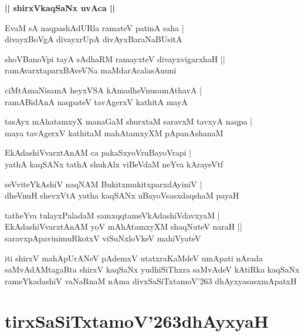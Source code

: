 \documentclass[twoside,12pt,openright]{book}
\def\S{\char'263}
\newcounter{shloka}[chapter]
\def\uvaca#1{\centerline{{\large\textbf{#1}}}}
\begin{document}
\uvaca{|| shirxVkaqSaNx uvAca ||}

\begin{shloka}%
EvaM sA naqpashAdURla ramateV patinA saha |\\
divayxBoVgA divayxrUpA divAyxBaraNaBUsitA
\end{shloka}

\begin{shloka}%
shoVBanoVpi tayA sAdhaRM ramayxteV divayxvigarxhaH ||\\
ramAvarxtaparxBAveVNa maMdarAcalasAnuni
\end{shloka}

\begin{shloka}%
ciMtAmaNisamA heyxVSA kAmadheVnusamAthavA |\\
ramABidAnA naqpateV tavAgerxV kathitA mayA
\end{shloka}

\begin{shloka}%
tasAyx mAhatamxyX manaGaM shurxtaM saravxM tavxyA naqpa |\\
maya tavAgerxV kathitaM mahAtamxyXM pApanAshanaM 
\end{shloka}

\begin{shloka}%
EkAdashiVvarxtAnAM ca pakaSxyoVruBayoVrapi |\\
yathA kaqSANx tathA shukAlx viBeVdaM neYva kArayeVtf
\end{shloka}

\begin{shloka}%
seVviteYkAshiV naqNAM BukitxmukitxparxdAyiniV |\\
dheVnuH shevxVtA yatha kaqSANx uBayoVsasxdaqshaM payaH
\end{shloka}

\begin{shloka}%
tatheYva tulayxPaladaM samxqqtameVkAdashiVdavxyaM |\\
EkAdashiVvarxtAnAM yoV mAhAtamxyXM shaqNuteV naraH ||\\
saravxpApavinimuRkotxV viSuNxloVkeV mahiVyateV
\end{shloka}

\begin{center}
iti shirxV mahApUrANeV pAdemxV utatxraKaMdeV umApati nArada saMvAdAMtagaRta shirxV kaqSaNx 
yudhiSiThxra saMvAdeV kAtiRka kaqSaNx rameYkadashiV vaNaRnaM nAma divxSaSiTxtamoV\S 
dhAyxyasasxmApatxH
\end{center}

\chapter{tirxSaSiTxtamoV\S dhAyxyaH}
\end{document}
